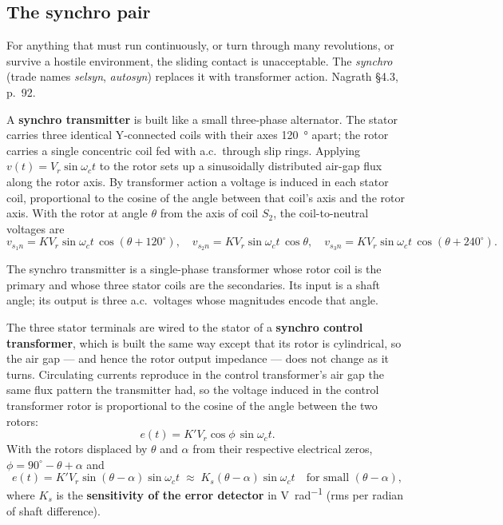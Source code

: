 \documentclass[11pt,a4paper]{article}
\begin{document}
\subsection{The synchro pair}

For anything that must run continuously, or turn through many revolutions, or
survive a hostile environment, the sliding contact is unacceptable. The
\emph{synchro} (trade names \emph{selsyn}, \emph{autosyn}) replaces it with
transformer action. Nagrath \S4.3, p.~92.

A \textbf{synchro transmitter} is built like a small three-phase alternator. The
stator carries three identical Y-connected coils with their axes
\SI{120}{\degree} apart; the rotor carries a single concentric coil fed with
a.c.\ through slip rings. Applying $v(t)=V_r\sin\omega_c t$ to the rotor sets up
a sinusoidally distributed air-gap flux along the rotor axis. By transformer
action a voltage is induced in each stator coil, proportional to the cosine of
the angle between that coil's axis and the rotor axis. With the rotor at angle
$\theta$ from the axis of coil $S_2$, the coil-to-neutral voltages are
\[
  v_{s_1n}=KV_r\sin\omega_c t\,\cos(\theta+120^\circ),\quad
  v_{s_2n}=KV_r\sin\omega_c t\,\cos\theta,\quad
  v_{s_3n}=KV_r\sin\omega_c t\,\cos(\theta+240^\circ).
\]

\begin{keyidea}
The synchro transmitter is a single-phase transformer whose rotor coil is the
primary and whose three stator coils are the secondaries. Its input is a shaft
angle; its output is three a.c.\ voltages whose magnitudes encode that angle.
\end{keyidea}

The three stator terminals are wired to the stator of a \textbf{synchro control
transformer}, which is built the same way except that its rotor is cylindrical,
so the air gap --- and hence the rotor output impedance --- does not change as
it turns. Circulating currents reproduce in the control transformer's air gap
the same flux pattern the transmitter had, so the voltage induced in the
control transformer rotor is proportional to the cosine of the angle between
the two rotors:
\[
  e(t)=K'V_r\cos\phi\,\sin\omega_c t .
\]
With the rotors displaced by $\theta$ and $\alpha$ from their respective
electrical zeros, $\phi=90^\circ-\theta+\alpha$ and
\begin{equation}
  e(t)=K'V_r\sin(\theta-\alpha)\sin\omega_c t
      \;\approx\; K_s(\theta-\alpha)\sin\omega_c t
      \quad\text{for small }(\theta-\alpha),
  \label{eq:synchro}
\end{equation}
where $K_s$ is the \textbf{sensitivity of the error detector} in
\si{\volt\per\radian} (rms per radian of shaft difference).
\end{document}

